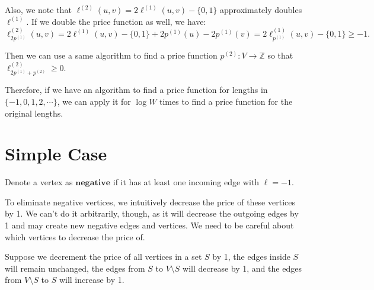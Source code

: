Also, we note that $\ell^{(2)}(u,v) = 2\ell^{(1)}(u,v) - \{0,1\}$ approximately doubles $\ell^{(1)}$. If we double the price function as well, we have:
\[ \ell^{(2)}_{2p^{(1)}}(u,v) = 2\ell^{(1)}(u,v) - \{0,1\} + 2p^{(1)}(u) - 2p^{(1)}(v) = 2\ell^{(1)}_{p^{(1)}}(u,v) - \{0,1\} \geq -1. \]

Then we can use a same algorithm to find a price function $p^{(2)}: V\to \mathbb{Z}$ so that $\ell^{(2)}_{2p^{(1)} + p^{(2)}}\ge 0$.

Therefore, if we have an algorithm to find a price function for lengths in $\{-1,0,1,2, \cdots\}$, we can apply it for $\log W$ times to find a price function for the original lengths.

\section{Simple Case}

Denote a vertex as $\textbf{negative}$ if it has at least one incoming edge with $\ell = -1$.

To eliminate negative vertices, we intuitively decrease the price of these vertices by 1. We can't do it arbitrarily, though, as it will decrease the outgoing edges by 1 and may create new negative edges and vertices. We need to be careful about which vertices to decrease the price of.

Suppose we decrement the price of all vertices in a set $S$ by 1, the edges inside $S$ will remain unchanged, the edges from $S$ to $V\setminus S$ will decrease by 1, and the edges from $V\setminus S$ to $S$ will increase by 1.

\begin{center}
\end{center}

